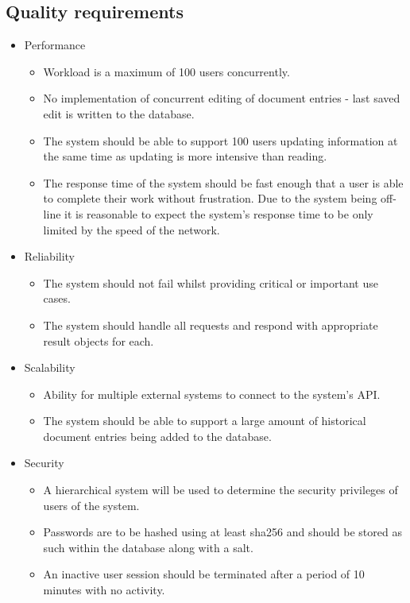 \documentclass{article}
\begin{document}
	\subsection{Quality requirements}\label{subsec:quality}
		\begin{itemize}
			\item Performance
			\begin{itemize}
				\item Workload is a maximum of 100 users concurrently.
				\item No implementation of concurrent editing of document entries - last saved edit is written to the database.
				\item The system should be able to support 100 users updating information at the same time as updating is more intensive than reading.
				\item The response time of the system should be fast enough that a user is able to complete their work without frustration. Due to the system being off-line it is reasonable to expect the system's response time to be only limited by the speed of the network.
			\end{itemize}
			\item Reliability
			\begin{itemize}
				\item The system should not fail whilst providing critical or important use cases.
				\item The system should handle all requests and respond with appropriate result objects for each.
			\end{itemize}
			\item Scalability
			\begin{itemize}
				\item Ability for multiple external systems to connect to the system's API.
				\item The system should be able to support a large amount of historical document entries being added to the database.
			\end{itemize}
			\item Security
			\begin{itemize}
				\item A hierarchical system will be used to determine the security privileges of users of the system.
				\item Passwords are to be hashed using at least sha256 and should be stored as such within the database along with a salt.
				\item An inactive user session should be terminated after a period of 10 minutes with no activity.

\end{itemize}
\end{itemize}
\end{document}
